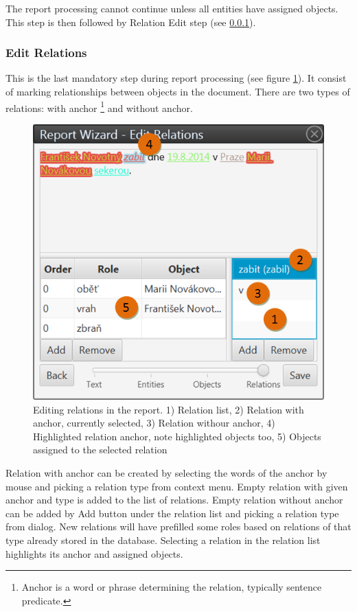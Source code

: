 \documentclass[12pt,a4paper]{report}
\begin{document}
The report processing cannot continue unless all entities have assigned
objects. This step is then followed by Relation Edit step (see
\ref{sssec:EditRelations}).

\subsubsection{Edit Relations}
\label{sssec:EditRelations}

This is the last mandatory step during report processing (see figure
\ref{fig:Relations}). It consist of marking relationships between objects in
the document. There are two types of relations: with anchor%
\footnote{Anchor is a word or phrase determining the relation, typically
sentence predicate.}
and without anchor.

\begin{figure}[!htb]
        \centering
        \includegraphics[width=\textwidth]{Images/relations}
        \caption{Editing relations in the report. 1) Relation list, 2) Relation with anchor, currently selected, 3) Relation withour anchor, 4) Highlighted relation anchor, note highlighted objects too, 5) Objects assigned to the selected relation}
        \label{fig:Relations}
\end{figure}

Relation with anchor can be created by selecting the words of the anchor by
mouse and picking a relation type from context menu. Empty relation with given
anchor and type is added to the list of relations. Empty relation without anchor
can be added by Add button under the relation list and picking a relation type
from dialog. New relations will have prefilled some roles based on relations of
that type already stored in the database. Selecting a relation in the relation
list highlights its anchor and assigned objects.
\end{document}
